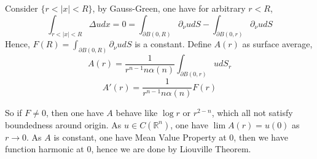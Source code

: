 Consider $\{r<|x|<R\}$, by Gauss-Green, one have for arbitrary $r<R$,
\begin{equation*}
    \int_{r<|x|<R} \Delta u dx = 0 = \int_{ \partial B(0,R)} \partial_{\nu} u dS -\int_{ \partial B(0,r)} \partial_{\nu} u dS
\end{equation*}
Hence, $F(R) = \int_{ \partial B(0,R)} \partial_{\nu} u dS$ is a constant. Define $A(r)$ as surface average,
$$ A(r) = \frac{1}{r^{n-1}n\alpha(n)} \int_{ \partial B(0,r)} u dS_r$$
$$A'(r) = \frac{1}{r^{n-1}n\alpha(n)} F(r) $$

So if $F \neq 0$, then one have $A$ behave like $\log r$ or $r^{2-n}$, which all not satisfy boundedness around origin. As $u\in C(\mathbb {R}^n)$, one have $\lim A(r) = u(0)$ as $r \to 0$. As $A$ is constant, one have Mean Value Property at 0, then we have function harmonic at 0, hence we are done by Liouville Theorem.


